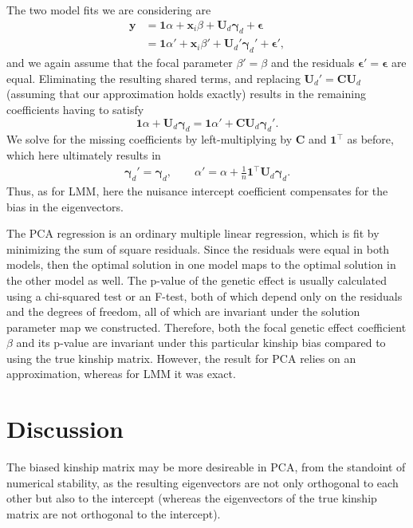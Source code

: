 \documentclass[11pt]{article}
\begin{document}
The two model fits we are considering are
\begin{align*}
  \mathbf{y}
  &=
    \mathbf{1} \alpha + \mathbf{x}_i \beta + \mathbf{U}_d \boldsymbol{\gamma}_d + \boldsymbol{\epsilon}
  \\
  &=
    \mathbf{1} \alpha' + \mathbf{x}_i \beta' + \mathbf{U}_d' \boldsymbol{\gamma}_d' + \boldsymbol{\epsilon}'
    ,
\end{align*}
and we again assume that the focal parameter $\beta' = \beta$ and the residuals $\boldsymbol{\epsilon}' = \boldsymbol{\epsilon}$ are equal.
Eliminating the resulting shared terms, and replacing $\mathbf{U}_d' = \mathbf{C} \mathbf{U}_d$ (assuming that our approximation holds exactly) results in the remaining coefficients having to satisfy
$$
\mathbf{1} \alpha + \mathbf{U}_d \boldsymbol{\gamma}_d
=
\mathbf{1} \alpha' + \mathbf{C} \mathbf{U}_d \boldsymbol{\gamma}_d'.
$$
We solve for the missing coefficients by left-multiplying by $\mathbf{C}$ and $\mathbf{1}^\intercal$ as before, which here ultimately results in
\begin{align*}
  \boldsymbol{\gamma}_d'
  =
    \boldsymbol{\gamma}_d
  ,
  \quad\quad
  \alpha'
  =
    \alpha + \frac{1}{n} \mathbf{1}^\intercal \mathbf{U}_d \boldsymbol{\gamma}_d
    .
\end{align*}
Thus, as for LMM, here the nuisance intercept coefficient compensates for the bias in the eigenvectors.

The PCA regression is an ordinary multiple linear regression, which is fit by minimizing the sum of square residuals.
Since the residuals were equal in both models, then the optimal solution in one model maps to the optimal solution in the other model as well.
The p-value of the genetic effect is usually calculated using a chi-squared test or an F-test, both of which depend only on the residuals and the degrees of freedom, all of which are invariant under the solution parameter map we constructed.
Therefore, both the focal genetic effect coefficient $\beta$ and its p-value are invariant under this particular kinship bias compared to using the true kinship matrix.
However, the result for PCA relies on an approximation, whereas for LMM it was exact.

\section{Discussion}

The biased kinship matrix may be more desireable in PCA, from the standoint of numerical stability, as the resulting eigenvectors are not only orthogonal to each other but also to the intercept (whereas the eigenvectors of the true kinship matrix are not orthogonal to the intercept).
\end{document}
